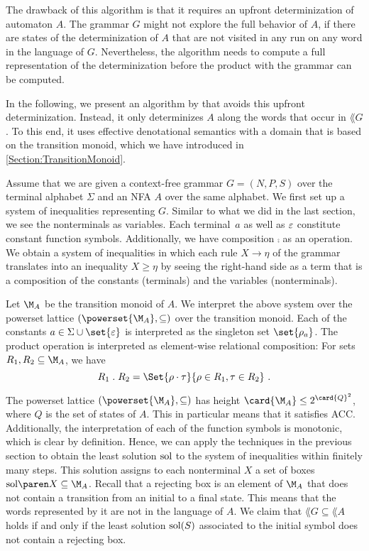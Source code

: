 \documentclass[../../diss.tex]{subfiles}
\begin{document}
The drawback of this algorithm is that it requires an upfront determinization of automaton $A$.
The grammar $G$ might not explore the full behavior of $A$, \eg if there are states of the determinization of $A$ that are not visited in any run on any word in the language of $G$.
Nevertheless, the algorithm needs to compute a full representation of the determinization before the product with the grammar can be computed.

In the following, we present an algorithm by  that avoids this upfront determinization.
Instead, it only determinizes $A$ along the words that occur in $\lang{G}$.
To this end, it uses effective denotational semantics with a domain that is based on the transition monoid, which we have introduced in \cref{Section:TransitionMonoid}.

Assume that we are given a context-free grammar $G = (N,P,S)$ over the terminal alphabet $\Sigma$ and an NFA $A$ over the same alphabet.
We first set up a system of inequalities representing $G$.
Similar to what we did in the last section, we see the nonterminals as variables.
Each terminal~$a$ as well as $\varepsilon$ constitute constant function symbols.
Additionally, we have composition $\comp$ as an operation.
We obtain a system of inequalities in which each rule
\(
    X \to \eta
\)
of the grammar translates into an inequality
\(
    X \geq \eta
\)
by seeing the right-hand side as a term that is a composition of the constants (terminals) and the variables (nonterminals).

Let $\nfatransmonoid{A}$ be the transition monoid of $A$.
We interpret the above system over the powerset lattice $(\powerset{\nfatransmonoid{A}},\subseteq)$ over the transition monoid.
Each of the constants $a \in \Sigma \cup \set{\eps}$ is interpreted as the singleton set $\set{ \tbox{a}}$.
The product operation is interpreted as element-wise relational composition: For sets $R_1,R_2 \subseteq \nfatransmonoid{A}$, we have
\[
    R_1 \comp R_2
    =
    \Set{ \rho \relcomp \tau }{ \rho \in R_1, \tau \in R_2}
    \ .
\]

The powerset lattice $(\powerset{\nfatransmonoid{A}},\subseteq)$ has height $\card{\nfatransmonoid{A}} \leq 2^{\card{Q}^2}$, where $Q$ is the set of states of $A$.
This in particular means that it satisfies ACC.\@
Additionally, the interpretation of each of the function symbols is monotonic, which is clear by definition.
Hence, we can apply the techniques in the previous section to obtain the least solution $\sol$ to the system of inequalities within finitely many steps.
This solution assigns to each nonterminal $X$ a set of boxes $\sol{X} \subseteq \nfatransmonoid{A}$.
Recall that a rejecting box is an element of $\nfatransmonoid{A}$ that does not contain a transition from an initial to a final state.
This means that the words represented by it are not in the language of $A$.
We claim that $\lang{G} \subseteq \lang{A}$ holds if and only if the least solution $\sol(S)$ associated to the initial symbol does not contain a rejecting box.
\end{document}
